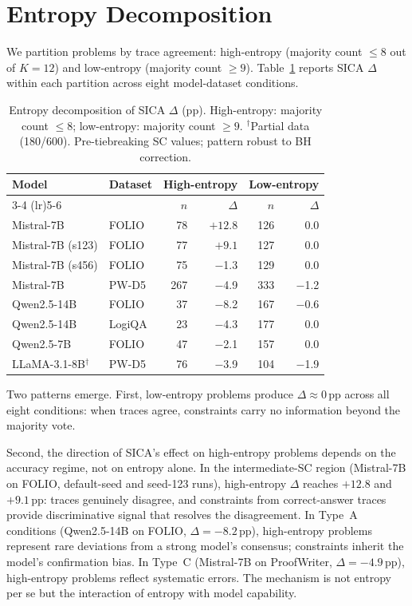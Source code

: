 \section{Entropy Decomposition}
\label{app:entropy}
\label{sec:entropy}

We partition problems by trace agreement: high-entropy (majority count $\leq 8$ out of $K = 12$) and low-entropy (majority count $\geq 9$). Table~\ref{tab:entropy} reports SICA $\Delta$ within each partition across eight model-dataset conditions.

\begin{table}[h]
\centering
\small
\caption{Entropy decomposition of SICA $\Delta$ (pp). High-entropy: majority count $\leq 8$; low-entropy: majority count $\geq 9$. $^\dagger$Partial data (180/600). Pre-tiebreaking SC values; pattern robust to BH correction.}
\label{tab:entropy}
\setlength{\tabcolsep}{3.5pt}
\begin{tabular}{@{}llrrrr@{}}
\toprule
Model & Dataset & \multicolumn{2}{c}{High-entropy} & \multicolumn{2}{c}{Low-entropy} \\
\cmidrule(lr){3-4} \cmidrule(lr){5-6}
 & & $n$ & $\Delta$ & $n$ & $\Delta$ \\
\midrule
Mistral-7B & FOLIO & 78 & $\mathbf{+12.8}$ & 126 & 0.0 \\
Mistral-7B (s123) & FOLIO & 77 & $\mathbf{+9.1}$ & 127 & 0.0 \\
Mistral-7B (s456) & FOLIO & 75 & $-$1.3 & 129 & 0.0 \\
Mistral-7B & PW-D5 & 267 & $-$4.9 & 333 & $-$1.2 \\
Qwen2.5-14B & FOLIO & 37 & $-$8.2 & 167 & $-$0.6 \\
Qwen2.5-14B & LogiQA & 23 & $-$4.3 & 177 & 0.0 \\
Qwen2.5-7B & FOLIO & 47 & $-$2.1 & 157 & 0.0 \\
LLaMA-3.1-8B$^\dagger$ & PW-D5 & 76 & $-$3.9 & 104 & $-$1.9 \\
\bottomrule
\end{tabular}
\end{table}

Two patterns emerge. First, low-entropy problems produce $\Delta \approx 0$\,pp across all eight conditions: when traces agree, constraints carry no information beyond the majority vote.

Second, the direction of SICA's effect on high-entropy problems depends on the accuracy regime, not on entropy alone. In the intermediate-SC region (Mistral-7B on FOLIO, default-seed and seed-123 runs), high-entropy $\Delta$ reaches $+12.8$ and $+9.1$\,pp: traces genuinely disagree, and constraints from correct-answer traces provide discriminative signal that resolves the disagreement. In Type~A conditions (Qwen2.5-14B on FOLIO, $\Delta = -8.2$\,pp), high-entropy problems represent rare deviations from a strong model's consensus; constraints inherit the model's confirmation bias. In Type~C (Mistral-7B on ProofWriter, $\Delta = -4.9$\,pp), high-entropy problems reflect systematic errors. The mechanism is not entropy per se but the interaction of entropy with model capability.


